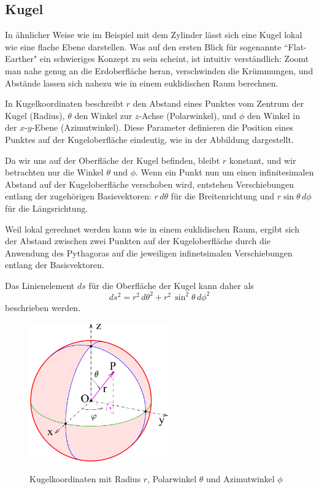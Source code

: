 %
%
%
%
\subsection{Kugel\label{geodaeten:section:Linienelement:Kugel}}

In ähnlicher Weise wie im Beispiel mit dem Zylinder lässt sich eine Kugel lokal wie eine flache Ebene darstellen.
Was auf den ersten Blick für sogenannte ``Flat-Earther" ein schwieriges Konzept zu sein scheint, ist intuitiv verständlich:
Zoomt man nahe genug an die Erdoberfläche heran, verschwinden die Krümmungen, und Abstände lassen sich nahezu wie in einem euklidischen Raum berechnen.

In Kugelkoordinaten beschreibt $r$ den Abstand eines Punktes vom Zentrum der Kugel (Radius), $\theta$ den Winkel zur $z$-Achse (Polarwinkel), und $\phi$ den Winkel in der $x$-$y$-Ebene (Azimutwinkel).
Diese Parameter definieren die Position eines Punktes auf der Kugeloberfläche eindeutig, wie in der Abbildung dargestellt.

Da wir uns auf der Oberfläche der Kugel befinden, bleibt $r$ konstant, und wir betrachten nur die Winkel $\theta$ und $\phi$.
Wenn ein Punkt nun um einen infinitesimalen Abstand auf der Kugeloberfläche verschoben wird, entstehen Verschiebungen entlang der zugehörigen Basisvektoren:
$r \, d\theta$ für die Breitenrichtung und $r \sin\theta \, d\phi$ für die Längsrichtung.

Weil lokal gerechnet werden kann wie in einem euklidischen Raum, ergibt sich der Abstand zwischen zwei Punkten auf der Kugeloberfläche durch die Anwendung des Pythagoras auf die jeweiligen infinetsimalen Verschiebungen entlang der Basisvektoren.

Das Linienelement $ds$ für die Oberfläche der Kugel kann daher als
\begin{equation}
ds^2 = r^2 \, d\theta^2 + r^2 \, \sin^2\theta \, d\phi^2
\end{equation}
beschrieben werden.

\begin{figure}
	\centering
	\includegraphics[width=6cm]{papers/geodaeten/Abbildungen/Linienelemente/LinKugel1}
	\caption{Kugelkoordinaten mit Radius $r$, Polarwinkel $\theta$ und Azimutwinkel $\phi$}
	\label{geodaeten:figure:Linienelemente:Kugelkoordinaten:Kugelkoordinaten}
	\cite{geodaeten:Kugelkoordinaten}
\end{figure}

